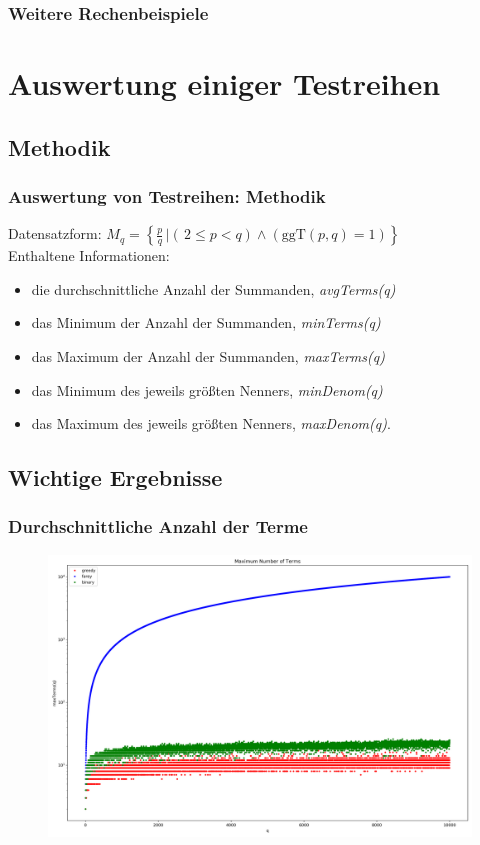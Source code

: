 \documentclass{beamer}
\begin{document}
\begin{frame}
	\frametitle{Weitere Rechenbeispiele}
\end{frame}

\section{Auswertung einiger Testreihen}
\subsection{Methodik}

\begin{frame}
	\frametitle{Auswertung von Testreihen: Methodik}
	Datensatzform: $M_q = \left\{ \frac{p}{q} \, | \left(\, 2\leq p < q\right) \wedge \left(\text{ggT}(p,q) = 1\right)\right\}$\\ \vspace{1cm}
	Enthaltene Informationen:
	\begin{itemize}
		\item die durchschnittliche Anzahl der Summanden, \emph{avgTerms(q)}
		\item das Minimum der Anzahl der Summanden, \emph{minTerms(q)}
		\item das Maximum der Anzahl der Summanden, \emph{maxTerms(q)}
		\item das Minimum des jeweils größten Nenners, \emph{minDenom(q)}
		\item das Maximum des jeweils größten Nenners, \emph{maxDenom(q)}.
	\end{itemize}
\end{frame}

\subsection[Ergebnisse]{Wichtige Ergebnisse}

\begin{frame}
	\frametitle{Durchschnittliche Anzahl der Terme}
	\begin{figure}[h]
		\includegraphics[width=\textwidth]{../LaTeX-Doc/images/maxTerms.png}
	\end{figure}
\end{frame}
\end{document}
